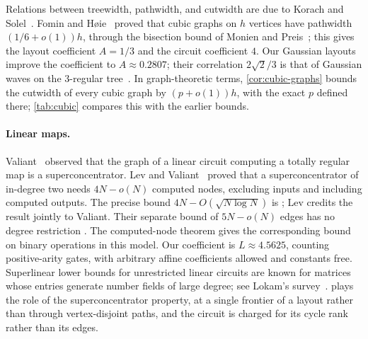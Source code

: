 \documentclass[11pt]{article}
\theoremstyle{plain}
\theoremstyle{definition}
\theoremstyle{remark}
\begin{document}
Relations between treewidth, pathwidth, and cutwidth are due to Korach and
Solel~\cite{KorachSolel1993}. Fomin and
H{\o}ie~\cite{FominHoie2006} proved that cubic graphs on $h$ vertices have pathwidth
$(1/6 + o(1))h$, through the bisection bound of Monien and Preis~\cite{MonienPreis2006}; this
gives the layout coefficient $A = 1/3$ and the circuit coefficient $4$. Our Gaussian layouts
improve the coefficient to $A \approx 0.2807$; their correlation $2\sqrt2/3$ is that of Gaussian
waves on the $3$-regular tree~\cite{CGHV2015,Lyons2017}. In graph-theoretic terms,
\cref{cor:cubic-graphs} bounds the cutwidth of every cubic graph by $(p+o(1))h$, with the
exact $p$ defined there; \cref{tab:cubic} compares this with the earlier bounds.

\paragraph{Linear maps.}
Valiant~\cite{Valiant1977} observed that the graph of a linear circuit computing a totally
regular map is a superconcentrator. Lev and Valiant~\cite{LevValiant1983} proved that a
superconcentrator of in-degree two needs $4N-o(N)$ computed nodes, excluding inputs and
including computed outputs. The precise bound $4N-O(\sqrt{N\log N})$ is
\cite[Theorem~3.2, p.~61]{Lev1980}; Lev credits the result jointly to Valiant.
Their separate bound of $5N-o(N)$ edges has no degree restriction
\cite[Theorem~3.3]{Lev1980}. The computed-node theorem gives the corresponding bound on
binary operations in this model. Our coefficient is $L\approx4.5625$, counting
positive-arity gates, with arbitrary affine coefficients allowed and constants free.
Superlinear lower bounds for
unrestricted linear circuits are known for matrices whose entries generate number fields of
large degree; see Lokam's survey~\cite{Lokam2009}.  plays the role of the
superconcentrator property, at a single frontier of a layout rather than through
vertex-disjoint paths, and the circuit is charged for its cycle rank rather than its edges.
\end{document}
